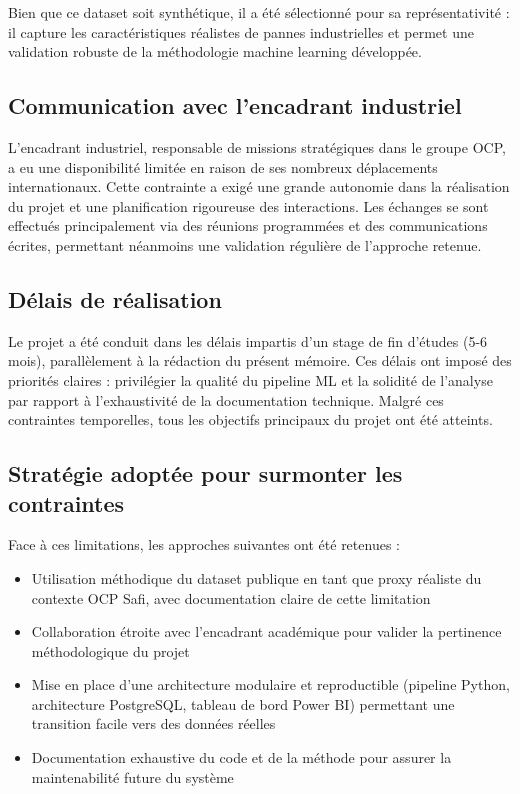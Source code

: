 \documentclass[a4paper,12pt,twoside]{report}
\begin{document}
Bien que ce dataset soit synthétique, il a été sélectionné pour sa représentativité : il capture les caractéristiques réalistes de pannes industrielles et permet une validation robuste de la méthodologie machine learning développée.

\subsection{Communication avec l'encadrant industriel}

L'encadrant industriel, responsable de missions stratégiques dans le groupe OCP, a eu une disponibilité limitée en raison de ses nombreux déplacements internationaux. Cette contrainte a exigé une grande autonomie dans la réalisation du projet et une planification rigoureuse des interactions. Les échanges se sont effectués principalement via des réunions programmées et des communications écrites, permettant néanmoins une validation régulière de l'approche retenue.

\subsection{Délais de réalisation}

Le projet a été conduit dans les délais impartis d'un stage de fin d'études (5-6 mois), parallèlement à la rédaction du présent mémoire. Ces délais ont imposé des priorités claires : privilégier la qualité du pipeline ML et la solidité de l'analyse par rapport à l'exhaustivité de la documentation technique. Malgré ces contraintes temporelles, tous les objectifs principaux du projet ont été atteints.

\subsection{Stratégie adoptée pour surmonter les contraintes}

Face à ces limitations, les approches suivantes ont été retenues :

\begin{itemize}
    \item Utilisation méthodique du dataset publique en tant que proxy réaliste du contexte OCP Safi, avec documentation claire de cette limitation
    \item Collaboration étroite avec l'encadrant académique pour valider la pertinence méthodologique du projet
    \item Mise en place d'une architecture modulaire et reproductible (pipeline Python, architecture PostgreSQL, tableau de bord Power BI) permettant une transition facile vers des données réelles
    \item Documentation exhaustive du code et de la méthode pour assurer la maintenabilité future du système
\end{itemize}
\end{document}
